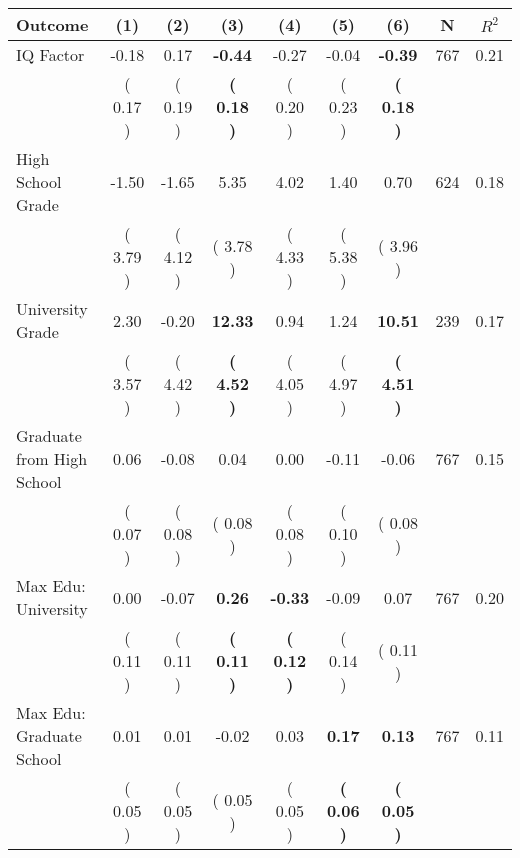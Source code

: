 \begin{tabular}{lcccccccc}
\toprule
 \textbf{Outcome} & \textbf{(1)} & \textbf{(2)} & \textbf{(3)} & \textbf{(4)} & \textbf{(5)} & \textbf{(6)} & \textbf{N} & \textbf{$ R^2$} \\
\midrule
IQ Factor &     -0.18 &      0.17 & \textbf{    -0.44} &     -0.27 &     -0.04 & \textbf{    -0.39} & 767 &       0.21 \\ 
 & (     0.17 ) & (     0.19 ) & \textbf{(     0.18 )} & (     0.20 ) & (     0.23 ) & \textbf{(     0.18 )} & \\
High School Grade &     -1.50 &     -1.65 &      5.35 &      4.02 &      1.40 &      0.70 & 624 &       0.18 \\ 
 & (     3.79 ) & (     4.12 ) & (     3.78 ) & (     4.33 ) & (     5.38 ) & (     3.96 ) & \\
University Grade &      2.30 &     -0.20 & \textbf{    12.33} &      0.94 &      1.24 & \textbf{    10.51} & 239 &       0.17 \\ 
 & (     3.57 ) & (     4.42 ) & \textbf{(     4.52 )} & (     4.05 ) & (     4.97 ) & \textbf{(     4.51 )} & \\
Graduate from High School &      0.06 &     -0.08 &      0.04 &      0.00 &     -0.11 &     -0.06 & 767 &       0.15 \\ 
 & (     0.07 ) & (     0.08 ) & (     0.08 ) & (     0.08 ) & (     0.10 ) & (     0.08 ) & \\
Max Edu: University &      0.00 &     -0.07 & \textbf{     0.26} & \textbf{    -0.33} &     -0.09 &      0.07 & 767 &       0.20 \\ 
 & (     0.11 ) & (     0.11 ) & \textbf{(     0.11 )} & \textbf{(     0.12 )} & (     0.14 ) & (     0.11 ) & \\
Max Edu: Graduate School &      0.01 &      0.01 &     -0.02 &      0.03 & \textbf{     0.17} & \textbf{     0.13} & 767 &       0.11 \\ 
 & (     0.05 ) & (     0.05 ) & (     0.05 ) & (     0.05 ) & \textbf{(     0.06 )} & \textbf{(     0.05 )} & \\
\bottomrule
\end{tabular}
